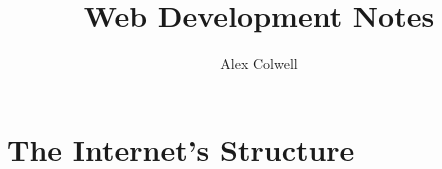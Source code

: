 \documentclass[a4paper,12pt,titlepage,oneside,final]{book}
\title{Web Development Notes}
\author{Alex Colwell}
\begin{document}
\maketitle
\tableofcontents

\chapter{The Internet's Structure}
\end{document}
